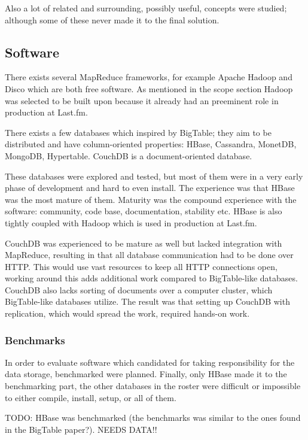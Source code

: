 Also a lot of related and surrounding, possibly useful, concepts were studied;
although some of these never made it to the final solution.
\cite{piglatin,mapreducemerge}


\subsection*{Software}

There exists several MapReduce frameworks, for example Apache Hadoop and
Disco\cite{disco} which are both free software. As mentioned in the scope
section Hadoop was selected to be built upon because it already had an
preeminent role in production at Last.fm.

There exists a few databases which inspired by BigTable; they aim to be
distributed and have column-oriented properties: HBase, Cassandra, MonetDB,
MongoDB, Hypertable. CouchDB is a document-oriented database.

These databases were explored and tested, but most of them were in a very early
phase of development and hard to even install. The experience was that HBase was
the most mature of them. Maturity was the compound experience with the software:
community, code base, documentation, stability etc. HBase is also tightly coupled
with Hadoop which is used in production at Last.fm.

CouchDB was experienced to be mature as well but lacked integration with
MapReduce, resulting in that all database communication had to be done over
HTTP. This would use vast resources to keep all HTTP connections open, working
around this adds additional work compared to BigTable-like databases. CouchDB
also lacks sorting of documents over a computer cluster, which BigTable-like
databases utilize. The result was that setting up CouchDB with replication,
which would spread the work, required hands-on work.


\subsubsection{Benchmarks}

In order to evaluate software which candidated for taking responsibility for the
data storage, benchmarked were planned. Finally, only HBase made it to the
benchmarking part, the other databases in the roster were difficult or
impossible to either compile, install, setup, or all of them.

TODO: HBase was benchmarked (the benchmarks was similar to the ones found in the
BigTable paper?). NEEDS DATA!!


